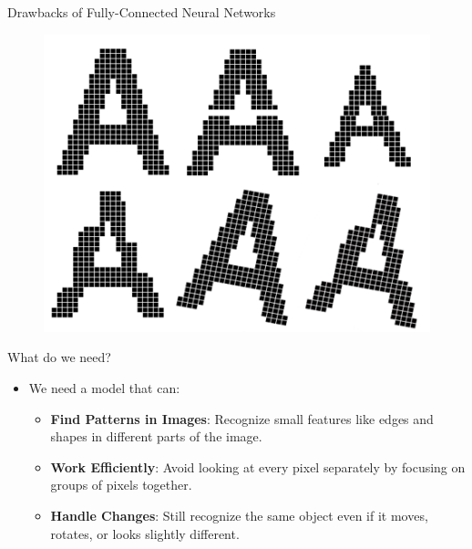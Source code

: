 \documentclass[10pt]{beamer}
\theoremstyle{remark}
\theoremstyle{definition}
\begin{document}
\begin{frame}[allowframebreaks]{Drawbacks of Fully-Connected Neural Networks}
\begin{figure}
\centering
\includegraphics[width=1.0\textwidth,height=0.6\textheight,keepaspectratio]{./images/nn_5.png}
\end{figure}


\end{frame}

\framebreak

\begin{frame}{What do we need?}
\begin{itemize}
    \item We need a model that can:
    \begin{itemize}
        \item \textbf{Find Patterns in Images}: Recognize small features like edges and shapes in different parts of the image.
        \item \textbf{Work Efficiently}: Avoid looking at every pixel separately by focusing on groups of pixels together.
        \item \textbf{Handle Changes}: Still recognize the same object even if it moves, rotates, or looks slightly different.
    \end{itemize}
\end{itemize}


\end{frame}

\framebreak
\end{document}
